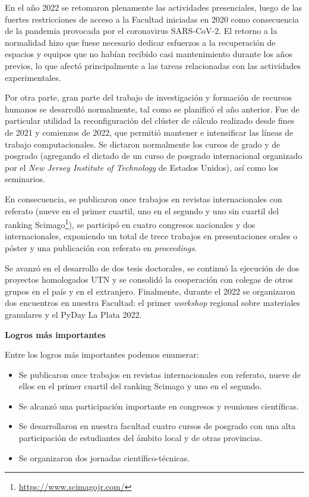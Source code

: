 \documentclass[a4paper,11pt,twoside,final,titlepage,onecolumn,openright]{report}
\begin{document}
En el año 2022 se retomaron plenamente las actividades presenciales, luego de las fuertes restricciones de acceso a la Facultad iniciadas en 2020 como consecuencia de la pandemia provocada por el coronavirus SARS-CoV-2. El retorno a la normalidad hizo que fuese necesario dedicar esfuerzos a la recuperación de espacios y equipos que no habían recibido casi mantenimiento durante los años previos, lo que afectó principalmente a las tareas relacionadas con las actividades experimentales.

Por otra parte, gran parte del trabajo de investigación y formación de recursos humanos se desarrolló normalmente, tal como se planificó el año anterior. Fue de particular utilidad la reconfiguración del clúster de cálculo realizado desde fines de 2021 y comienzos de 2022, que permitió mantener e intensificar las líneas de trabajo computacionales. Se dictaron normalmente los cursos de grado y de posgrado (agregando el dictado de un curso de posgrado internacional organizado por el \textit{New Jersey Institute of Technology} de Estados Unidos), así como los seminarios.

En consecuencia, se publicaron once trabajos en revistas internacionales con referato (nueve en el primer cuartil, uno en el segundo y uno sin cuartil del ranking Scimago\footnote{\href{https://www.scimagojr.com/}{https://www.scimagojr.com/}}), se participó en cuatro congresos nacionales y dos internacionales, exponiendo un total de trece trabajos en presentaciones orales o póster y una publicación con referato en \textit{proceedings}.

Se avanzó en el desarrollo de dos tesis doctorales, se continuó la ejecución de dos proyectos homologados UTN y se consolidó la cooperación con colegas de otros grupos en el país y en el extranjero. Finalmente, durante el 2022 se organizaron dos encuentros en nuestra Facultad: el primer \textit{workshop} regional sobre materiales granulares y el PyDay La Plata 2022.
\vspace{0.5cm}

{\bf Logros más importantes}

Entre los logros más importantes podemos enumerar:

\begin{itemize}
\item Se publicaron once trabajos en revistas internacionales con referato, nueve de ellos en el primer cuartil del ranking Scimago y uno en el segundo.
\item Se alcanzó una participación importante en congresos y reuniones científicas.
\item Se desarrollaron en nuestra facultad cuatro cursos de posgrado con una alta participación de estudiantes del ámbito local y de otras provincias.
\item Se organizaron dos jornadas científico-técnicas.
\end{itemize}
\end{document}
